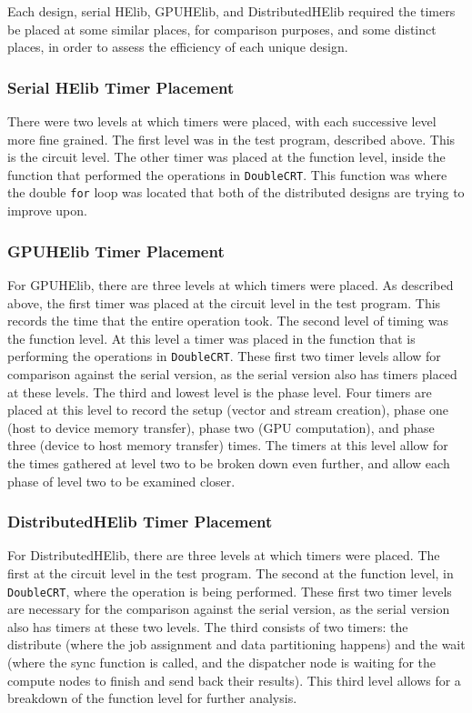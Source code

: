 Each design, serial HElib, GPUHElib, and DistributedHElib required the timers be placed at some similar places, for comparison purposes, and some distinct places, in order to assess the efficiency of each unique design.

\subsubsection{Serial HElib Timer Placement}
There were two levels at which timers were placed, with each successive level more fine grained. The first level was in the test program, described above. This is the circuit level. The other timer was placed at the function level, inside the function that performed the operations in \verb|DoubleCRT|. This function was where the double \verb|for| loop was located that both of the distributed designs are trying to improve upon.

\subsubsection{GPUHElib Timer Placement}
For GPUHElib, there are three levels at which timers were placed. As described above, the first timer was placed at the circuit level in the test program. This records the time that the entire operation took. The second level of timing was the function level. At this level a timer was placed in the function that is performing the operations in \verb|DoubleCRT|. These first two timer levels allow for comparison against the serial version, as the serial version also has timers placed at these levels. The third and lowest level is the phase level. Four timers are placed at this level to record the setup (vector and stream creation), phase one (host to device memory transfer), phase two (GPU computation), and phase three (device to host memory transfer) times. The timers at this level allow for the times gathered at level two to be broken down even further, and allow each phase of level two to be examined closer.

\subsubsection{DistributedHElib Timer Placement}
For DistributedHElib, there are three levels at which timers were placed. The first at the circuit level in the test program. The second at the function level, in \verb|DoubleCRT|, where the operation is being performed. These first two timer levels are necessary for the comparison against the serial version, as the serial version also has timers at these two levels. The third consists of two timers: the distribute (where the job assignment and data partitioning happens) and the wait (where the sync function is called, and the dispatcher node is waiting for the compute nodes to finish and send back their results). This third level allows for a breakdown of the function level for further analysis. 

